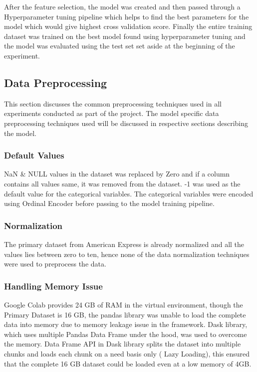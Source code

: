 \documentclass[twoside,11pt,a4paper]{article}
\begin{document}
\FloatBarrier
After the feature selection, the model was created and then passed through a Hyperparameter tuning pipeline which helps to find the best parameters for the model which would give highest cross validation score. Finally the entire training dataset was trained on the best model found using hyperparameter tuning and the model was evaluated using the test set set aside at the beginning of the experiment.

\subsection{Data Preprocessing} 
This section discusses the common preprocessing techniques used in all experiments conducted as part of the project. The model specific data preprocessing techniques used will be discussed in respective sections describing the model.

\subsubsection{Default Values}
NaN \& NULL values in the dataset was replaced by Zero and if a column contains all values same, it was removed from the dataset. -1 was used as the default value for the categorical variables. The categorical variables were encoded using Ordinal Encoder before passing to the model training pipeline.

\subsubsection{Normalization}
The primary dataset from American Express is already normalized and all the values lies between zero to ten, hence none of the data normalization techniques were used to preprocess the data.
\subsubsection{Handling Memory Issue}
Google Colab provides 24 GB of \acf{RAM} in the  virtual environment, though the Primary Dataset is 16 GB,  the pandas library was unable to load the complete data into memory due to memory leakage issue in the framework. Dask library, which uses multiple Pandas Data Frame under the hood, was used to overcome the memory. Data Frame API in Dask library splits the dataset into multiple chunks and loads each chunk on a need basis only ( Lazy Loading), this ensured that the complete 16 GB dataset could be loaded even at a low memory of 4GB.
\end{document}
